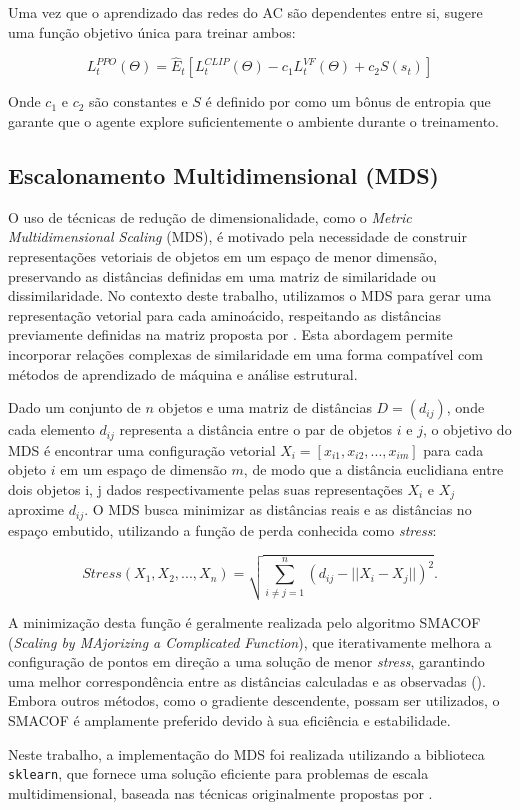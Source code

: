 Uma vez que o aprendizado das redes do AC são dependentes entre si, \cite{PPO} sugere uma função objetivo única para treinar ambos:

\begin{equation}
   L_t ^{PPO} (\Theta) = \hat{E}_t[L_t ^{CLIP} (\Theta) - c_1 L_t ^{VF} (\Theta) + c_2 S(s_t)]
\end{equation}

Onde $c_1$ e $c_2$ são constantes e $S$ é definido por \cite{PPO} como um bônus de entropia que garante que o agente explore suficientemente o ambiente durante o treinamento.


\subsection{Escalonamento Multidimensional (MDS)}  
\label{subsection:MDS}  

O uso de técnicas de redução de dimensionalidade, como o \textit{Metric Multidimensional Scaling} (MDS),
é motivado pela necessidade de construir representações vetoriais de objetos em um espaço de menor dimensão,
preservando as distâncias definidas em uma matriz de similaridade ou dissimilaridade.
No contexto deste trabalho, utilizamos o MDS para gerar uma representação vetorial para cada aminoácido,
respeitando as distâncias previamente definidas na matriz proposta por \cite{aminodist}. 
Esta abordagem permite incorporar relações complexas de similaridade em uma forma compatível com métodos de aprendizado de máquina e
análise estrutural.  

Dado um conjunto de $n$ objetos e uma matriz de distâncias $D = (d_{ij})$,
onde cada elemento $d_{ij}$ representa a distância entre o par de objetos $i$ e $j$,
o objetivo do MDS é encontrar uma configuração vetorial $X_i = [x_{i1}, x_{i2}, ..., x_{im}]$ 
para cada objeto $i$ em um espaço de dimensão $m$,
de modo que a distância euclidiana entre dois objetos i, j 
dados respectivamente pelas suas representações $X_i$ e $X_j$ aproxime $d_{ij}$. 
O MDS busca minimizar as distâncias reais e as distâncias no espaço embutido, 
utilizando a função de perda conhecida como \textit{stress}:

\begin{equation}
    Stress(X_1, X_2, ..., X_n) = \sqrt{\sum_{i \neq j = 1}^{n} (d_{ij} - ||X_i - X_j||)^2}.
\end{equation}

A minimização desta função é geralmente realizada pelo algoritmo 
SMACOF (\textit{Scaling by MAjorizing a Complicated Function}),
que iterativamente melhora a configuração de pontos em direção a uma solução de menor \textit{stress},
garantindo uma melhor correspondência entre as distâncias calculadas e as observadas (\cite{mds}).
Embora outros métodos, como o gradiente descendente, possam ser utilizados, 
o SMACOF é amplamente preferido devido à sua eficiência e estabilidade.

Neste trabalho, 
a implementação do MDS foi realizada utilizando a biblioteca \texttt{sklearn}, 
que fornece uma solução eficiente para problemas de escala multidimensional, 
baseada nas técnicas originalmente propostas por \cite{mds}.












